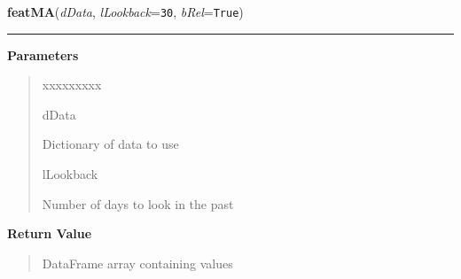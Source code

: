 \hspace{.8\funcindent}\begin{boxedminipage}{\funcwidth}

    \raggedright \textbf{featMA}(\textit{dData}, \textit{lLookback}={\tt 30}, \textit{bRel}={\tt True})

    \vspace{-1.5ex}

    \rule{\textwidth}{0.5\fboxrule}
\setlength{\parskip}{2ex}
\setlength{\parskip}{1ex}
      \textbf{Parameters}
      \vspace{-1ex}

      \begin{quote}
        \begin{Ventry}{xxxxxxxxx}

          \item[dData]

          Dictionary of data to use

          \item[lLookback]

          Number of days to look in the past

        \end{Ventry}

      \end{quote}

      \textbf{Return Value}
    \vspace{-1ex}

      \begin{quote}
      DataFrame array containing values

      \end{quote}

    \end{boxedminipage}

    \label{QSTK:qstkfeat:features:featRSI}

    \vspace{0.5ex}

